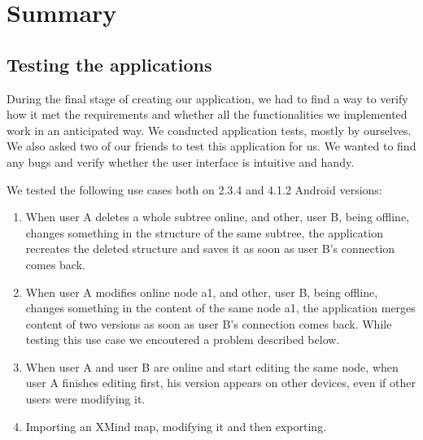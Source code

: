 %
%
%
%
%

\chapter{Summary}
\label{chap:summary}

\section{Testing the applications}
\label{sec:summary-testing}
During the final stage of creating our application, we had to find a way to verify how it met the requirements and whether all the functionalities we implemented work in an anticipated way. We conducted application tests, mostly by ourselves. We also asked two of our friends to test this application for us. We wanted to find any bugs and verify whether the user interface is intuitive and handy. 

We tested the following use cases both on 2.3.4 and 4.1.2 Android versions:

\begin{enumerate}
	\item When user A deletes a whole subtree online, and other, user B, being offline, changes something in the structure of the same subtree, the application recreates the deleted structure and saves it as soon as user B's connection comes back.
	
	\item When user A modifies online node a1, and other, user B, being offline, changes something in the content of the same node a1, the application merges content of two versions as soon as user B's connection comes back. 
	While testing this use case we encoutered a problem described below.
	
	\item When user A and user B are online and start editing the same node, when user A finishes  editing first, his version appears on other devices, even if other users were modifying it.
	
	\item Importing an XMind map, modifying it and then exporting.
\end{enumerate}

